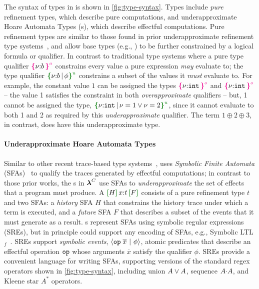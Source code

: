 The syntax of types in \DSL{} is shown in \autoref{fig:type-syntax}.
Types include \emph{pure} refinement types, which describe pure
computations, and underapproximate Hoare Automata Types (\tyName{}s),
which describe effectful computations.
Pure refinement types are similar to those found in prior
underapproximate refinement type systems~\cite{CoverageType}, and
allow base types (e.g., {}) to be further constrained by a
logical formula or qualifier. In contrast to traditional type systems
where a pure type qualifier $\ort{b}{\phi}$ constrains every value a
pure expression \emph{may} evaluate to; the type qualifier
$\urt{b}{\phi}$ constrains a subset of the values it \emph{must}
evaluate to.  For example, the constant value $1$ can be assigned the
types $\ort{\Int}{\vnu = 1}$ and $\ort{\Int}{0 < \vnu}$ -- the value 1
satisfies the constraint in both \emph{overapproximate} qualifiers --
but, 1 cannot be assigned the type,
$\urt{\Int}{\vnu = 1 \lor \vnu = 2}$, since it cannot evaluate to both
1 and 2 as required by this \emph{underapproximate} qualifier. The
term $1 \oplus 2 \oplus 3$, in contrast, does have this
underapproximate type.

\paragraph{Underapproximate Hoare Automata Types}

Similar to other recent trace-based type systems~\cite{ZYDJ24}, \DSL{}
uses \emph{Symbolic Finite Automata} (SFAs)~\cite{Vea13,
  SFA-minimization, SFA-Transducers} to qualify the traces generated
by effectful computations; in contrast to those prior works, the
\tyName{}s in $\DSL{}$ use SFAs to \emph{underapproximate} the set of effects
that a program must produce. A \tyName{} $\uhat{H}{x{:}t}{F}$ consists
of a pure refinement type $t$ and two SFAs: a \emph{history} SFA $H$
that constrains the history trace under which a term is executed, and a
\emph{future} SFA $F$ that describes a subset of the events that it
must generate as a result. \tyName{}s represent SFAs using symbolic
regular expressions (SREs), but in principle could support any
encoding of SFAs, e.g., Symbolic LTL$_f$~\cite{LTLf}. SREs support
\emph{symbolic events}, $\msgB{op}{\overline{x}}{\phi}$, atomic
predicates that describe an effectful operation {$\eff{op}$} whose
arguments $\overline{x}$ satisfy the qualifier $\phi$. SREs provide a
convenient language for writing SFAs, supporting versions of the
standard regex operators shown in \autoref{fig:type-syntax}, including
union $A \lorA A$, sequence $A \seqA A$, and Kleene star $A^*$
operators.

